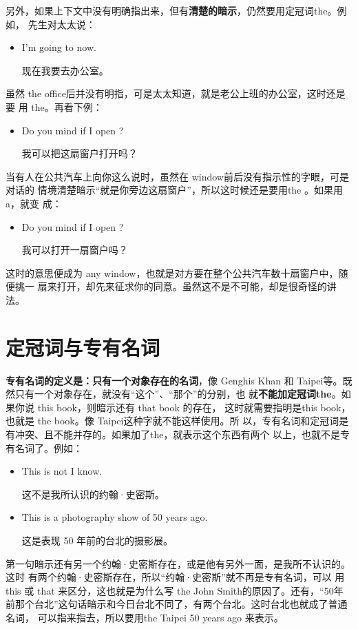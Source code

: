 另外，如果上下文中没有明确指出来，但有\textbf{清楚的暗示}，仍然要用定冠词the。例如，
先生对太太说：
\begin{itemize}
\item  I'm going to  now.

  现在我要去办公室。
\end{itemize}

虽然 the office后并没有明指，可是太太知道，就是老公上班的办公室，这时还是要
用 the。再看下例：
\begin{itemize}
\item  Do you mind if I open ?

  我可以把这扇窗户打开吗？
\end{itemize}

当有人在公共汽车上向你这么说时，虽然在 window前后没有指示性的字眼，可是对话的
情境清楚暗示“就是你旁边这扇窗户”，所以这时候还是要用the 。如果用 a，就变
成：
\begin{itemize}
\item  Do you mind if I open ?

  我可以打开一扇窗户吗？
\end{itemize}
这时的意思便成为 any window，也就是对方要在整个公共汽车数十扇窗户中，随便挑一
扇来打开，却先来征求你的同意。虽然这不是不可能，却是很奇怪的讲法。


\section{定冠词与专有名词}

\textbf{专有名词的定义是：只有一个对象存在的名词}，像 Genghis
Khan 和 Taipei等。既然只有一个对象存在，就没有“这个”、“那个”的分别，也
就\textbf{不能加定冠词the}。如果你说 this book，则暗示还有 that book 的存在，
这时就需要指明是this book，也就是 the book。像 Taipei这种字就不能这样使用。所
以，专有名词和定冠词是有冲突、且不能并存的。如果加了the，就表示这个东西有两个
以上，也就不是专有名词了。例如：

\begin{itemize}
\item  This is not  I know.

这不是我所认识的约翰·史密斯。
\item  This is a photography show of  50 years ago.

这是表现 50 年前的台北的摄影展。
\end{itemize}

第一句暗示还有另一个约翰·史密斯存在，或是他有另外一面，是我所不认识的。这时
有两个约翰·史密斯存在，所以“约翰·史密斯”就不再是专有名词，可以
用this 或 that 来区分，这也就是为什么写 the John Smith的原因了。还有，“50年
前那个台北”这句话暗示和今日台北不同了，有两个台北。这时台北也就成了普通名词，
可以指来指去，所以要用the Taipei 50 years ago 来表示。

